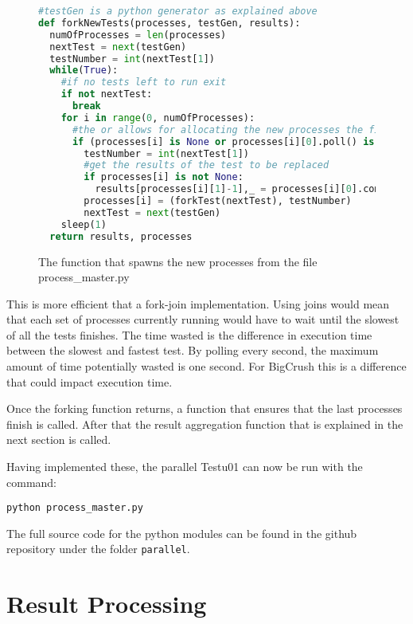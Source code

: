 \begin{figure}[h]
\begin{lstlisting}[language=Python]
#testGen is a python generator as explained above
def forkNewTests(processes, testGen, results):
  numOfProcesses = len(processes)
  nextTest = next(testGen)
  testNumber = int(nextTest[1])
  while(True):
    #if no tests left to run exit
    if not nextTest:
      break
    for i in range(0, numOfProcesses):
      #the or allows for allocating the new processes the first time this code is executed
      if (processes[i] is None or processes[i][0].poll() is not None) and nextTest:
        testNumber = int(nextTest[1])
        #get the results of the test to be replaced
        if processes[i] is not None:
          results[processes[i][1]-1],_ = processes[i][0].communicate()
        processes[i] = (forkTest(nextTest), testNumber)
        nextTest = next(testGen)
    sleep(1)
  return results, processes
\end{lstlisting}
\caption{The function that spawns the new processes from the file process\_master.py}
\label{fig:forkNewTests}
\end{figure}

This is more efficient that a fork-join implementation. Using joins would mean that each set of processes currently running would have to wait until the slowest of all the tests finishes. The time wasted is the difference in execution time between the slowest and fastest test. By polling every second, the maximum amount of time potentially wasted is one second. For BigCrush this is a difference that could impact execution time.

Once the forking function returns, a function that ensures that the last processes finish is called. After that the result aggregation function that is explained in the next section is called.

Having implemented these, the parallel Testu01 can now be run with the command:

\begin{verbatim}
python process_master.py
\end{verbatim}

The full source code for the python modules can be found in the github repository\cite{github-repo} under the folder \texttt{parallel}.

\section{Result Processing}

